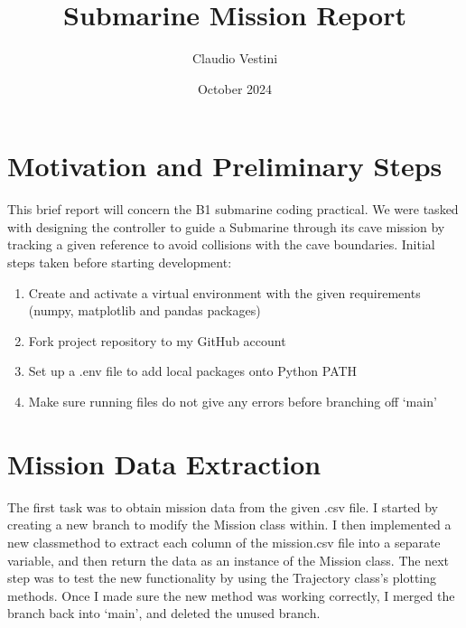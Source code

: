 \documentclass[hidelinks]{article}
\title{Submarine Mission Report}
\author{Claudio Vestini}
\date{October 2024}
\begin{document}
\maketitle
%
\section{Motivation and Preliminary Steps}
This brief report will concern the B1 submarine coding practical.
\newline
We were tasked with designing the controller to guide a Submarine through its cave mission by tracking a given reference to avoid collisions with the cave boundaries.
\newline
Initial steps taken before starting development:
%
\begin{enumerate}
    \item Create and activate a virtual environment with the given requirements (numpy, matplotlib and pandas packages)
    \item Fork project repository to my GitHub account
    \item Set up a .env file to add local packages onto Python PATH
    \item Make sure running files do not give any errors before branching off `main'
\end{enumerate}
%
\section{Mission Data Extraction}
The first task was to obtain mission data from the given .csv file.
\newline
I started by creating a new branch to modify the Mission class within. I then implemented a new classmethod to extract each column of the mission.csv file into a separate variable, and then return the data as an instance of the Mission class.
\newline
The next step was to test the new functionality by using the Trajectory class's plotting methods. Once I made sure the new method was working correctly, I merged the branch back into `main', and deleted the unused branch.
%
\end{document}
